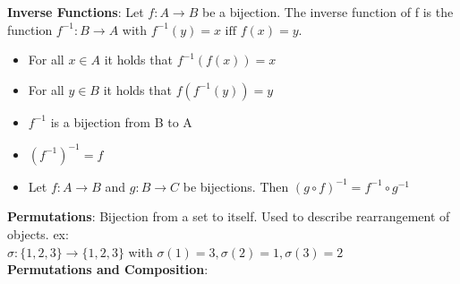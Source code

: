 \textbf{Inverse Functions}: Let $f: A \rightarrow B$ be a bijection. The inverse function of f is the function $f^{-1}: B \rightarrow A$ with $f^{-1}(y) = x \text{ iff } f(x) = y$.
\begin{itemize}[noitemsep,topsep=0pt,leftmargin=*]
    \item For all $x \in A$ it holds that $f^{-1}(f(x)) = x$ 
    \item For all $y \in B$ it holds that $f(f^{-1}(y)) = y$
    \item $f^{-1}$ is a bijection from B to A
    \item $(f^{-1})^{-1} = f$
    \item Let $f: A \rightarrow B$ and $g: B \rightarrow C$ be bijections. Then $(g \circ f)^{-1} = f^{-1} \circ g^{-1}$
\end{itemize} 
\textbf{Permutations}: Bijection from a set to itself. Used to describe rearrangement of objects. ex: \\
$\sigma: \{1, 2, 3\} \rightarrow \{1, 2, 3\}$ with $\sigma(1) = 3, \sigma(2) = 1, \sigma(3) = 2$ \\
\textbf{Permutations and Composition}: \\ 
